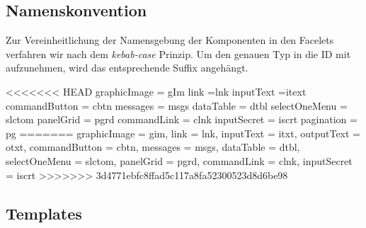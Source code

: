\newcommand{\ftable}[1]{\begin{sidewaystable}
\begin{tabular}[H]{ |m{1.5cm}| m{1.5cm}| m{3cm}| m{7cm} |m{4cm}| m{4cm}| }
    \toprule
    \textbf{ID} & \textbf{Typ} & \textbf{Beschreibung} & \textbf{Binding} & \textbf{Constraints} & \textbf{Validator \newline Converter} \\
    \midrule
    #1
\end{tabular}
\end{sidewaystable}
}

\newcommand{\fentry}[6]{\footnotesize#1 &\footnotesize#2 &\footnotesize#3 &\footnotesize#4 &\footnotesize#5 &\footnotesize#6\\\hline}


\subsection{Namenskonvention}

Zur Vereinheitlichung der Namensgebung der Komponenten in den Facelets verfahren wir nach dem \emph{kebab-case} Prinzip. Um den genauen Typ in die ID mit aufzunehmen, wird das entsprechende Suffix angehängt.

<<<<<<< HEAD
 graphicImage = gIm link =lnk inputText =itext commandButton = cbtn messages = msgs dataTable = dtbl selectOneMenu = slctom panelGrid = pgrd commandLink = clnk inputSecret = iscrt pagination = pg
=======
 graphicImage = gim, link = lnk, inputText = itxt, outputText = otxt, commandButton = cbtn, messages = msgs, dataTable = dtbl, selectOneMenu = slctom, panelGrid = pgrd, commandLink = clnk, inputSecret = iscrt
>>>>>>> 3d4771ebfc8ffad5c117a8fa52300523d8d6be98

\subsection{Templates}

